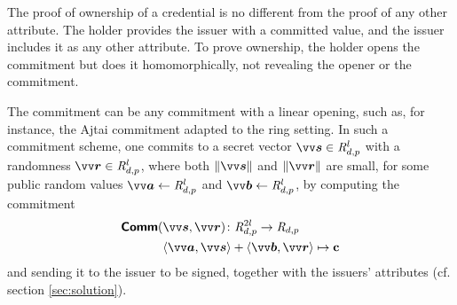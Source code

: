 The proof of ownership of a credential is no different from the proof of any other attribute. The holder provides the issuer with a committed value, and the issuer includes it as any other attribute. To prove ownership, the holder opens the commitment but does it homomorphically, not revealing the opener or the commitment.

The commitment can be any commitment with a linear opening, such as, for instance, the Ajtai commitment \cite{ajtaiGeneratingHardInstances1996} adapted to the ring setting. In such a commitment scheme, one commits to a secret vector $\pv{s} \in \intring_{d,p}^l$ with a randomness $\pv{r} \in \intring_{d,p}^l$, where both $\|\pv{s}\|$ and $\|\pv{r}\|$ are small, for some public random values $\pv{a}\from \intring_{d,p}^l$ and $\pv{b}\from \intring_{d,p}^l$, by computing the commitment
\begin{equation}\label{eq:commit}
\begin{aligned}
    \bkw{Comm}(&\pv{s},\pv{r})\colon \intring_{d,p}^{2l} \to \intring_{d,p}\\
    &\inprod{\pv{a}}{\pv{s}}+\inprod{\pv{b}}{\pv{r}} \mapsto  \pc
\end{aligned} 
\end{equation}
and sending it to the issuer to be signed, together with the issuers' attributes (cf. section \ref{sec:solution}).

